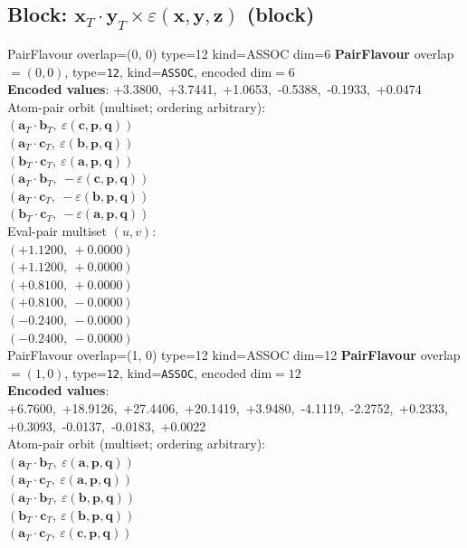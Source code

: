 \documentclass[a4paper,11pt]{article}
\newcommand{\fpbeomcfokjooi}[2]{\mathbf{#1}_T \cdot \mathbf{#2}_T}
\newcommand{\kblbmcpggoncpf}[3]{\varepsilon(\mathbf{#1},\mathbf{#2},\mathbf{#3})}
\begin{document}
\subsection{Block: $\fpbeomcfokjooi{x}{y} \times \kblbmcpggoncpf{x}{y}{z}$  (block)}
    PairFlavour  overlap=(0, 0)  type=12  kind=ASSOC  dim=6
\textbf{PairFlavour} overlap$=(0, 0)$, type=\texttt{12}, kind=\texttt{ASSOC}, encoded dim$=6$\\
\textbf{      Encoded values}: +3.3800,\ +3.7441,\ +1.0653,\ -0.5388,\ -0.1933,\ +0.0474\\
\quad Atom-pair orbit (multiset; ordering arbitrary):\\
$(\fpbeomcfokjooi{a}{b},\ \kblbmcpggoncpf{c}{p}{q})$\\
$(\fpbeomcfokjooi{a}{c},\ \kblbmcpggoncpf{b}{p}{q})$\\
$(\fpbeomcfokjooi{b}{c},\ \kblbmcpggoncpf{a}{p}{q})$\\
$(\fpbeomcfokjooi{a}{b},\ -\kblbmcpggoncpf{c}{p}{q})$\\
$(\fpbeomcfokjooi{a}{c},\ -\kblbmcpggoncpf{b}{p}{q})$\\
$(\fpbeomcfokjooi{b}{c},\ -\kblbmcpggoncpf{a}{p}{q})$\\
\quad Eval-pair multiset $(u, v)$:\\
$(+1.1200,\ +0.0000)$\\
$(+1.1200,\ +0.0000)$\\
$(+0.8100,\ +0.0000)$\\
$(+0.8100,\ -0.0000)$\\
$(-0.2400,\ -0.0000)$\\
$(-0.2400,\ -0.0000)$\\
    PairFlavour  overlap=(1, 0)  type=12  kind=ASSOC  dim=12
\textbf{PairFlavour} overlap$=(1, 0)$, type=\texttt{12}, kind=\texttt{ASSOC}, encoded dim$=12$\\
\textbf{      Encoded values}: +6.7600,\ +18.9126,\ +27.4406,\ +20.1419,\ +3.9480,\ -4.1119,\ -2.2752,\ +0.2333,\ +0.3093,\ -0.0137,\ -0.0183,\ +0.0022\\
\quad Atom-pair orbit (multiset; ordering arbitrary):\\
$(\fpbeomcfokjooi{a}{b},\ \kblbmcpggoncpf{a}{p}{q})$\\
$(\fpbeomcfokjooi{a}{c},\ \kblbmcpggoncpf{a}{p}{q})$\\
$(\fpbeomcfokjooi{a}{b},\ \kblbmcpggoncpf{b}{p}{q})$\\
$(\fpbeomcfokjooi{b}{c},\ \kblbmcpggoncpf{b}{p}{q})$\\
$(\fpbeomcfokjooi{a}{c},\ \kblbmcpggoncpf{c}{p}{q})$\\
\end{document}
